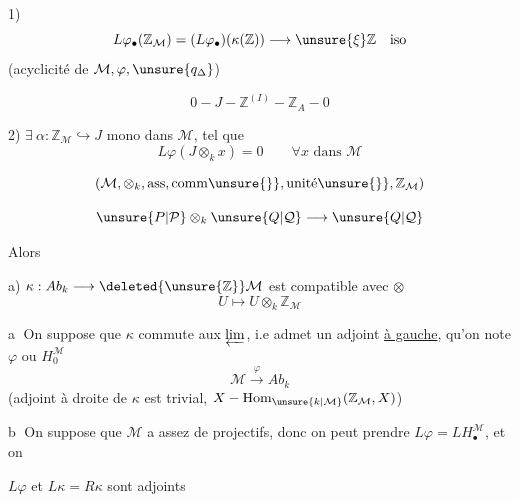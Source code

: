 
1)
\[
L\varphi_\bullet(\mathbb Z_{\mathcal M})=(L\varphi_\bullet)(\kappa(\mathbb Z))
\longrightarrow\unsure{\xi}\mathbb Z\quad\text{iso}
\]
(acyclicité de $\mathcal M,\varphi,\unsure{q_\Delta}$)

\[
0\mathbin{-}J\mathbin{-}\mathbb Z^{(I)}\mathbin{-}\mathbb Z_A\mathbin{-}0
\]

2) $\exists\ \alpha:\mathbb Z_{\mathcal M}\hookrightarrow J$ mono dans $\mathcal M$, tel que
\[
L\varphi(J\otimes_kx)=0\qquad\forall x\text{ dans }\mathcal M
\]

\[
(\mathcal M,\otimes_k,\mathrm{ass},\mathrm{comm}\unsure{\}},\text{unité}\unsure{\}},\mathbb Z_{\mathcal M})
\]


\qquad{}
\[
\unsure{P|\mathcal P}\otimes_k\unsure{Q|\mathcal Q}\longrightarrow\unsure{Q|\mathcal Q}
\]

Alors

a) $\kappa:Ab_k\longrightarrow\deleted{\unsure{\mathbb Z}}\mathcal M$
est compatible avec $\otimes$
\[
U\longmapsto U\otimes_k\mathbb Z_{\mathcal M}
\]

\textcircled{a} On suppose que $\kappa$ 
commute aux $\varprojlim$, i.e admet un adjoint \uline{à gauche}, qu'on note $\varphi$ ou $H_0^{\mathcal M}$
\[
\mathcal M\xrightarrow{\varphi}Ab_k
\]
(adjoint à droite de $\kappa$ est trivial,
$X\mathbin{-}\operatorname{Hom}_{\unsure{k|\mathcal M}}(\mathbb Z_{\mathcal M},X)$)


\textcircled{b} On suppose que $\mathcal M$ a assez de projectifs, donc
on peut prendre $L\varphi=LH_\bullet^{\mathcal M}$, et on 

$L\varphi$ et $L\kappa=R\kappa$ sont adjoints

